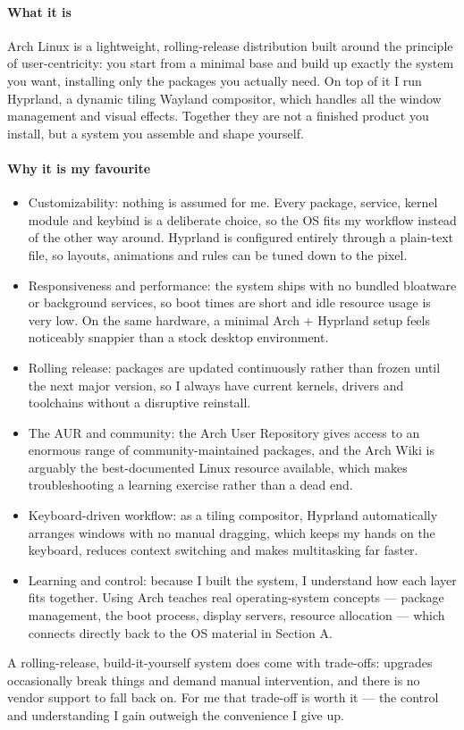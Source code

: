 \paragraph{What it is}
Arch Linux is a lightweight, rolling-release distribution built around the principle of user-centricity: you start from a minimal base and build up exactly the system you want, installing only the packages you actually need. On top of it I run Hyprland, a dynamic tiling Wayland compositor, which handles all the window management and visual effects. Together they are not a finished product you install, but a system you assemble and shape yourself.
\paragraph{Why it is my favourite}
\begin{itemize}
    \item Customizability: nothing is assumed for me. Every package, service, kernel module and keybind is a deliberate choice, so the OS fits my workflow instead of the other way around. Hyprland is configured entirely through a plain-text file, so layouts, animations and rules can be tuned down to the pixel.
    \item Responsiveness and performance: the system ships with no bundled bloatware or background services, so boot times are short and idle resource usage is very low. On the same hardware, a minimal Arch + Hyprland setup feels noticeably snappier than a stock desktop environment.
    \item Rolling release: packages are updated continuously rather than frozen until the next major version, so I always have current kernels, drivers and toolchains without a disruptive reinstall.
    \item The AUR and community: the Arch User Repository gives access to an enormous range of community-maintained packages, and the Arch Wiki is arguably the best-documented Linux resource available, which makes troubleshooting a learning exercise rather than a dead end.
    \item Keyboard-driven workflow: as a tiling compositor, Hyprland automatically arranges windows with no manual dragging, which keeps my hands on the keyboard, reduces context switching and makes multitasking far faster.
    \item Learning and control: because I built the system, I understand how each layer fits together. Using Arch teaches real operating-system concepts — package management, the boot process, display servers, resource allocation — which connects directly back to the OS material in Section A.
\end{itemize}
A rolling-release, build-it-yourself system does come with trade-offs: upgrades occasionally break things and demand manual intervention, and there is no vendor support to fall back on. For me that trade-off is worth it — the control and understanding I gain outweigh the convenience I give up.



